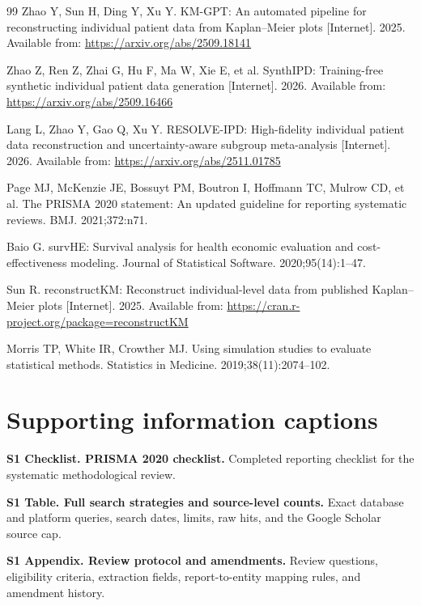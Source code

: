 \documentclass[12pt,letterpaper]{article}
\begin{document}
\begin{thebibliography}{99}
Zhao Y, Sun H, Ding Y, Xu Y. KM-GPT: An automated pipeline for reconstructing individual patient data from Kaplan--Meier plots [Internet]. 2025. Available from: \url{https://arxiv.org/abs/2509.18141}

Zhao Z, Ren Z, Zhai G, Hu F, Ma W, Xie E, et al. SynthIPD: Training-free synthetic individual patient data generation [Internet]. 2026. Available from: \url{https://arxiv.org/abs/2509.16466}

Lang L, Zhao Y, Gao Q, Xu Y. RESOLVE-IPD: High-fidelity individual patient data reconstruction and uncertainty-aware subgroup meta-analysis [Internet]. 2026. Available from: \url{https://arxiv.org/abs/2511.01785}

Page MJ, McKenzie JE, Bossuyt PM, Boutron I, Hoffmann TC, Mulrow CD, et al. The PRISMA 2020 statement: An updated guideline for reporting systematic reviews. BMJ. 2021;372:n71.

Baio G. survHE: Survival analysis for health economic evaluation and cost-effectiveness modeling. Journal of Statistical Software. 2020;95(14):1--47.

Sun R. reconstructKM: Reconstruct individual-level data from published Kaplan--Meier plots [Internet]. 2025. Available from: \url{https://cran.r-project.org/package=reconstructKM}

Morris TP, White IR, Crowther MJ. Using simulation studies to evaluate statistical methods. Statistics in Medicine. 2019;38(11):2074--102.

\end{thebibliography}

\section*{Supporting information captions}
\textbf{S1 Checklist. PRISMA 2020 checklist.} Completed reporting checklist for the systematic methodological review.

\textbf{S1 Table. Full search strategies and source-level counts.} Exact database and platform queries, search dates, limits, raw hits, and the Google Scholar source cap.

\textbf{S1 Appendix. Review protocol and amendments.} Review questions, eligibility criteria, extraction fields, report-to-entity mapping rules, and amendment history.
\end{document}
